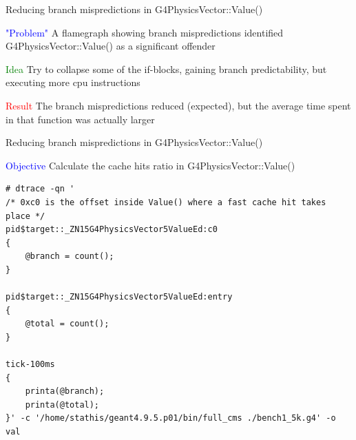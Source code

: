 \documentclass{beamer}
\begin{document}
\begin{frame}{Reducing branch mispredictions in G4PhysicsVector::Value()}

\textcolor{blue}{"Problem"} A flamegraph showing branch mispredictions identified
G4PhysicsVector::Value() as a significant offender

\vspace{5mm}

\textcolor{green}{Idea} Try to collapse some of the if-blocks, gaining branch
predictability, but executing more cpu instructions

\vspace{5mm}

\textcolor{red}{Result} The branch mispredictions reduced (expected), but the
average time spent in that function was actually larger

\end{frame}

\begin{frame}[fragile]{Reducing branch mispredictions in G4PhysicsVector::Value()}

\textcolor{blue}{Objective} Calculate the cache hits ratio in G4PhysicsVector::Value()

\lstset{basicstyle=\tiny\ttfamily}
\lstset{frame=single, columns=flexible}
\begin{lstlisting}
# dtrace -qn '
/* 0xc0 is the offset inside Value() where a fast cache hit takes place */
pid$target::_ZN15G4PhysicsVector5ValueEd:c0
{ 
    @branch = count();
}

pid$target::_ZN15G4PhysicsVector5ValueEd:entry
{
    @total = count();
}

tick-100ms
{
    printa(@branch);
    printa(@total);
}' -c '/home/stathis/geant4.9.5.p01/bin/full_cms ./bench1_5k.g4' -o val
\end{lstlisting}
\end{frame}
\end{document}
